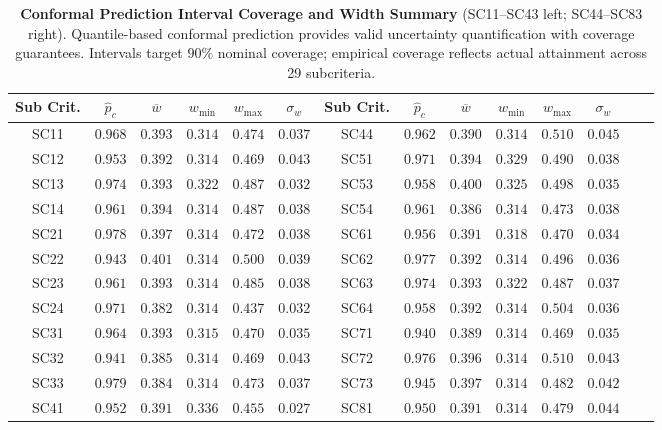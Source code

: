\documentclass[12pt,a4paper]{article}
\begin{document}
\begin{table}[H]
\centering
\caption{%
    \textbf{Conformal Prediction Interval Coverage and Width Summary} (SC11--SC43 left; SC44--SC83 right).
    Quantile-based conformal prediction provides valid uncertainty quantification with coverage guarantees.
    Intervals target $90\%$ nominal coverage; empirical coverage reflects actual attainment across 29 subcriteria.
}
\label{tab:conformal_coverage}
\small
\begin{tabular}{cccccccccccccc}
\toprule
\multicolumn{1}{c}{\textbf{Sub Crit.}} & $\hat{p}_c$ & $\overline{w}$ & $w_{\min}$ & $w_{\max}$ & $\sigma_w$ & 
\multicolumn{1}{c}{\textbf{Sub Crit.}} & $\hat{p}_c$ & $\overline{w}$ & $w_{\min}$ & $w_{\max}$ & $\sigma_w$ \\
\midrule
SC11 & $0.968$ & $0.393$ & $0.314$ & $0.474$ & $0.037$ & SC44 & $0.962$ & $0.390$ & $0.314$ & $0.510$ & $0.045$ \\
SC12 & $0.953$ & $0.392$ & $0.314$ & $0.469$ & $0.043$ & SC51 & $0.971$ & $0.394$ & $0.329$ & $0.490$ & $0.038$ \\
SC13 & $0.974$ & $0.393$ & $0.322$ & $0.487$ & $0.032$ & SC53 & $0.958$ & $0.400$ & $0.325$ & $0.498$ & $0.035$ \\
SC14 & $0.961$ & $0.394$ & $0.314$ & $0.487$ & $0.038$ & SC54 & $0.961$ & $0.386$ & $0.314$ & $0.473$ & $0.038$ \\
SC21 & $0.978$ & $0.397$ & $0.314$ & $0.472$ & $0.038$ & SC61 & $0.956$ & $0.391$ & $0.318$ & $0.470$ & $0.034$ \\
SC22 & $0.943$ & $0.401$ & $0.314$ & $0.500$ & $0.039$ & SC62 & $0.977$ & $0.392$ & $0.314$ & $0.496$ & $0.036$ \\
SC23 & $0.961$ & $0.393$ & $0.314$ & $0.485$ & $0.038$ & SC63 & $0.974$ & $0.393$ & $0.322$ & $0.487$ & $0.037$ \\
SC24 & $0.971$ & $0.382$ & $0.314$ & $0.437$ & $0.032$ & SC64 & $0.958$ & $0.392$ & $0.314$ & $0.504$ & $0.036$ \\
SC31 & $0.964$ & $0.393$ & $0.315$ & $0.470$ & $0.035$ & SC71 & $0.940$ & $0.389$ & $0.314$ & $0.469$ & $0.035$ \\
SC32 & $0.941$ & $0.385$ & $0.314$ & $0.469$ & $0.043$ & SC72 & $0.976$ & $0.396$ & $0.314$ & $0.510$ & $0.043$ \\
SC33 & $0.979$ & $0.384$ & $0.314$ & $0.473$ & $0.037$ & SC73 & $0.945$ & $0.397$ & $0.314$ & $0.482$ & $0.042$ \\
SC41 & $0.952$ & $0.391$ & $0.336$ & $0.455$ & $0.027$ & SC81 & $0.950$ & $0.391$ & $0.314$ & $0.479$ & $0.044$ \\

\end{tabular}
\end{table}
\end{document}
